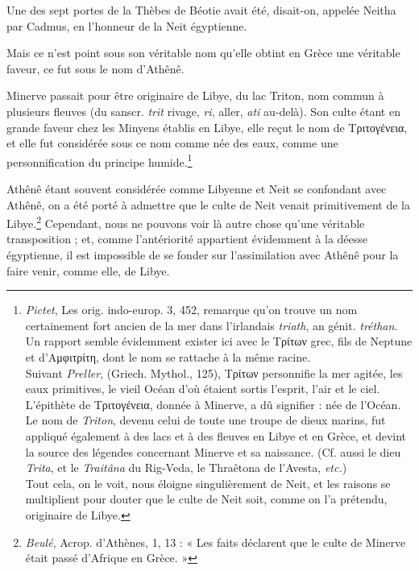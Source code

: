 \documentclass[letterpaper,twocolumn,openany,nodeprecatedcode]{dndbook}
\begin{document}
Une des sept portes de la Thèbes de Béotie avait été, disait-on, appelée Neitha par Cadmus, en l'honneur de la Neit égyptienne.

Mais ce n'est point sous son véritable nom qu'elle obtint en Grèce une véritable faveur, ce fut sous le nom d'Athênê.

Minerve passait pour être originaire de Libye, du lac Triton, nom commun à plusieurs fleuves (du sanscr. \emph{trit} rivage, \emph{ri}, aller, \emph{ati} au-delà). Son culte étant en grande faveur chez les Minyens établis en Libye, elle reçut le nom de Τριτογένεια, et elle fut considérée sous ce nom comme née des eaux, comme une personnification du principe humide.\footnote{\emph{Pictet}, Les orig. indo-europ. 3, 452, remarque qu'on trouve un nom certainement fort ancien de la mer dans l'irlandais \emph{triath}, an génit. \emph{tréthan}. Un rapport semble évidemment exister ici avec le Τρίτων grec, fils de Neptune et d'Αμφιτρίτη, dont le nom se rattache à la même racine.\\\hspace*{5mm}Suivant \emph{Preller}, (Griech. Mythol., 125), Τρίτων personnifie la mer agitée, les eaux primitives, le vieil Océan d'où étaient sortis l'esprit, l'air et le ciel. L'épithète de Τριτογένεια, donnée à Minerve, a dû signifier : née de l'Océan. Le nom de \emph{Triton}, devenu celui de toute une troupe de dieux marins, fut appliqué également à des lacs et à des fleuves en Libye et en Grèce, et devint la source des légendes concernant Minerve et sa naissance. (Cf. aussi le dieu \emph{Trita}, et le \emph{Traitâna} du Rig-Veda, le Thraêtona de l'Avesta, \emph{etc.})\\\hspace*{5mm}Tout cela, on le voit, nous éloigne singulièrement de Neit, et les raisons se multiplient pour douter que le culte de Neit soit, comme on l'a prétendu, originaire de Libye.}

Athênê étant souvent considérée comme Libyenne et Neit se confondant avec Athênê, on a été porté à admettre que le culte de Neit venait primitivement de la Libye.\footnote{\emph{Beulé}, Acrop. d'Athènes, 1, 13 : « Les faits déclarent que le culte de Minerve était passé d'Afrique en Grèce. »} Cependant, nous ne pouvons voir là autre chose qu'une véritable transposition ; et, comme l'antériorité appartient évidemment à la déesse égyptienne, il est impossible de se fonder sur l'assimilation avec Athênê pour la faire venir, comme elle, de Libye.
\end{document}
